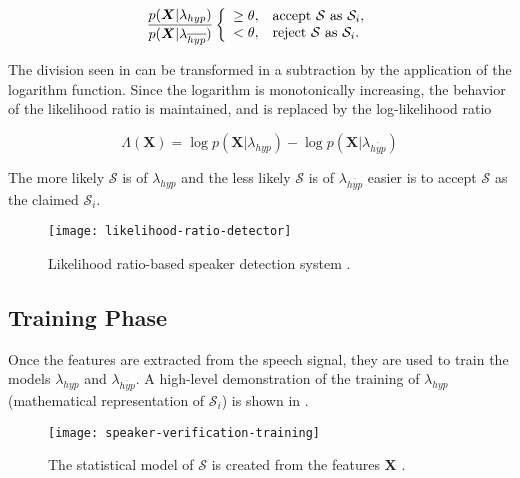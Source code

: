 \begin{equation}
    \frac{p(\boldsymbol{X}|\lambda_{hyp})}{p(\boldsymbol{X}|\lambda_{\overline{hyp}})} \verifytest{\theta}{\mathcal{S} \text{ as } \mathcal{S}_i}
    \label{eq:likelihood-ratio-test-3}
\end{equation}

The division seen in  can be transformed in a subtraction by the application of the logarithm function. Since the logarithm is monotonically increasing, the behavior of the likelihood ratio is maintained, and  is replaced by the log-likelihood ratio

\begin{equation}
    \Lambda(\boldsymbol{X}) = \log p(\boldsymbol{X}|\lambda_{hyp}) - \log p(\boldsymbol{X}|\lambda_{\overline{hyp}})
    \label{eq:log-likelihood-ratio}
\end{equation}

\noindent The more likely $\mathcal{S}$ is of $\lambda_{hyp}$ and the less likely $\mathcal{S}$ is of $\lambda_{\overline{hyp}}$ easier is to accept $\mathcal{S}$ as the claimed $\mathcal{S}_i$.

\begin{figure}[ht]
    \centering
    \texttt{[image: likelihood-ratio-detector]}
    \caption{Likelihood ratio-based speaker detection system .}
    \label{fig:likelihood-ratio-detector}
\end{figure}

\subsection{Training Phase}

Once the features are extracted from the speech signal, they are used to train the models $\lambda_{hyp}$ and $\lambda_{\overline{hyp}}$. A high-level demonstration of the training of $\lambda_{hyp}$ (mathematical representation of $\mathcal{S}_i$) is shown in .

\begin{figure}[ht]
    \centering
    \texttt{[image: speaker-verification-training]}
    \caption{The statistical model of $\mathcal{S}$ is created from the features $\boldsymbol{X}$ .}
    \label{fig:speaker-verification-training}
\end{figure}

